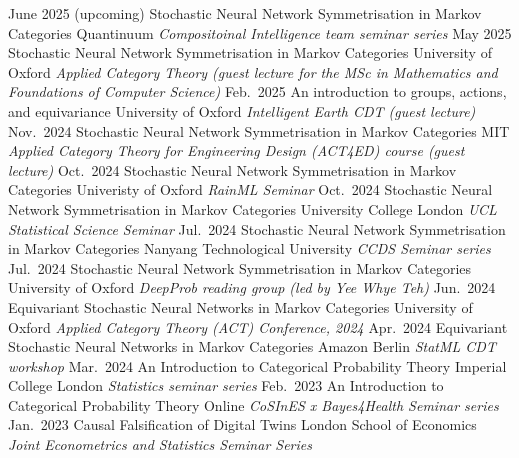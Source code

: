 \documentclass[9pt]{developercv} %
\begin{document}

\begin{entrylist}
    \entry
        {June 2025 (upcoming)}
        {Stochastic Neural Network Symmetrisation in Markov Categories}
        {Quantinuum}
        {\textit{Compositoinal Intelligence team seminar series}}
    \entry
        {May 2025}
        {Stochastic Neural Network Symmetrisation in Markov Categories}
        {University of Oxford}
        {\textit{Applied Category Theory (guest lecture for the MSc in Mathematics and Foundations of Computer Science)}}
    \entry
        {Feb.\ 2025}
        {An introduction to groups, actions, and equivariance}
        {University of Oxford}
        {\textit{Intelligent Earth CDT (guest lecture)}}
    \entry
        {Nov.\ 2024}
        {Stochastic Neural Network Symmetrisation in Markov Categories}
        {MIT}
        {\textit{Applied Category Theory for Engineering Design (ACT4ED) course (guest lecture)}}
    \entry
        {Oct.\ 2024}
        {Stochastic Neural Network Symmetrisation in Markov Categories}
        {Univeristy of Oxford}
        {\textit{RainML Seminar}}
    \entry
        {Oct.\ 2024}
        {Stochastic Neural Network Symmetrisation in Markov Categories}
        {University College London}
        {\textit{UCL Statistical Science Seminar}}
    \entry
        {Jul.\ 2024}
        {Stochastic Neural Network Symmetrisation in Markov Categories}
        {Nanyang Technological University}
        {\textit{CCDS Seminar series}}
    \entry
        {Jul.\ 2024}
        {Stochastic Neural Network Symmetrisation in Markov Categories}
        {University of Oxford}
        {\textit{DeepProb reading group (led by Yee Whye Teh)}}
    \entry
        {Jun.\ 2024}
        {Equivariant Stochastic Neural Networks in Markov Categories}
        {University of Oxford}
        {\textit{Applied Category Theory (ACT) Conference, 2024}}
    \entry
        {Apr.\ 2024}
        {Equivariant Stochastic Neural Networks in Markov Categories}
        {Amazon Berlin}
        {\textit{StatML CDT workshop}}
    \entry
        {Mar.\ 2024}
        {An Introduction to Categorical Probability Theory}
        {Imperial College London}
        {\textit{Statistics seminar series}}
    \entry
        {Feb.\ 2023}
        {An Introduction to Categorical Probability Theory}
        {Online}
        {\textit{CoSInES x Bayes4Health Seminar series}}
    \entry
        {Jan.\ 2023}
        {Causal Falsification of Digital Twins}
        {London School of Economics}
        {\textit{Joint Econometrics and Statistics Seminar Series}}

\end{entrylist}
\end{document}
